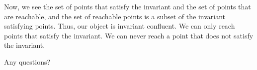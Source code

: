 \begin{frame}
{    Now, we see the set of points that satisfy the invariant and the set of
    points that are reachable, and the set of reachable points is a subset of
    the invariant satisfying points. Thus, our object is invariant confluent.
    We can only reach points that satisfy the invariant. We can never reach a
    point that does not satisfy the invariant.

    Any questions?
  }
\end{frame}
